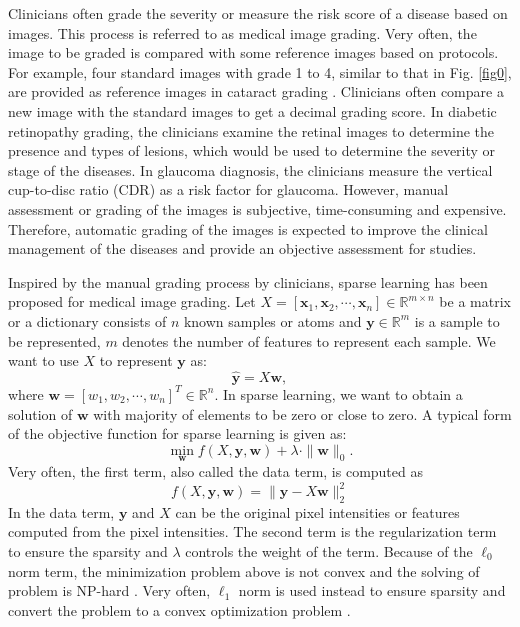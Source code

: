 \documentclass[journal]{IEEEtran}
\begin{document}
  Clinicians  often   grade the severity or measure the risk score of a disease  based on images. This process is referred to as medical image grading.  Very often, the image to be graded is compared with some reference images  based on protocols. For example, four standard images with grade 1 to 4, similar to that in Fig. \ref{fig0}, are provided as reference images in cataract grading \cite{Xu13}. Clinicians often compare a new image with  the standard images to get a decimal grading score. In diabetic retinopathy grading, the clinicians  examine the retinal images to determine the presence and types of  lesions, which would be used to determine the  severity or stage of the diseases. In glaucoma diagnosis, the clinicians measure the vertical cup-to-disc ratio (CDR) as a risk factor for glaucoma.   However, manual assessment or grading of the images is subjective, time-consuming and expensive. Therefore, automatic grading of the images is expected to improve the clinical management of the  diseases and provide an objective assessment for studies.


  Inspired by the manual grading process by clinicians, sparse learning has been proposed for medical image grading.
  Let $X=[\textbf{x}_1, \textbf{x}_2,\cdots, \textbf{x}_n]\in \mathbb{R}^{m\times n}$ be a matrix or a dictionary consists of  $n$ known samples or atoms and $\textbf{y}\in \mathbb{R}^m$ is a sample to be represented, $m$ denotes the number of features to represent each sample.   We want to use $X$ to represent $\textbf{y}$ as:
  \begin{equation}
  \hat{\textbf{y}}=X\textbf{w}, \label{eq1}
  \end{equation}
  where $\textbf{w} = [w_1, w_2, \cdots, w_n]^T\in \mathbb{R}^n$. In sparse learning, we want to obtain a solution of $\textbf{w}$ with majority of elements to be zero or close to zero.
  A typical form of the objective function for sparse learning is given as:
   \begin{equation}
    \min_{\textbf{w}} f(X,\textbf{y},\textbf{w}) +\lambda \cdot \|\textbf{w}\|_0.  \label{eq2}
  \end{equation}
    Very often, the first term,  also called the data term, is computed as
  \begin{equation}
  f(X, \textbf{y}, \textbf{w})= \|\textbf{y}-X\textbf{w}\|^2_2 \label{eq3}
  \end{equation}
  In the data term, $\textbf{y}$ and $X$ can be the original pixel intensities or features computed from the pixel intensities.
     The second term is the regularization term to ensure the sparsity and   $\lambda$ controls the weight of the term.
  Because of the  $\ell_0$ norm term, the minimization problem above is not convex and the solving of problem is NP-hard \cite{6873279}.  Very often, $\ell_1$ norm is used instead  to ensure sparsity  and convert the problem to a convex optimization problem \cite{CPA:CPA20132}.
\end{document}
